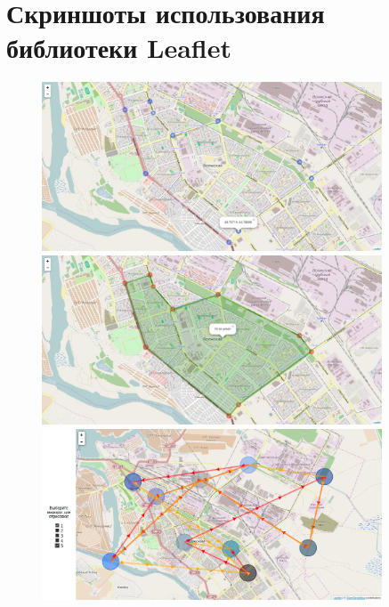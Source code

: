 \documentclass[a4paper, 14pt]{extreport}
\begin{document}
    \chapter{Скриншоты использования библиотеки Leaflet}
    \begin{figure}[ht!]
        \center
        \includegraphics[width=0.9\textwidth]{e1}
        \includegraphics[width=0.9\textwidth]{e2}
        \includegraphics[width=0.9\textwidth]{e3}
    \end{figure}

    \newpage
\end{document}
